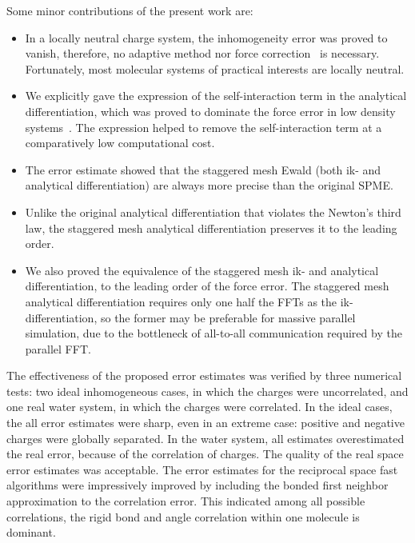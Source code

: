 \documentclass[aps,pre,preprint,unsortedaddress]{revtex4}
\newcommand{\recheck}[1]{{\color{red} #1}}
\newcommand{\redc}[1]{{\color{red} #1}}
\begin{document}

Some minor contributions of the present work are:
\begin{itemize}\itemsep -3pt
\item In a locally neutral charge system, the inhomogeneity
  error was proved to vanish, therefore, no adaptive method nor
  force correction~\cite{wang2012} is necessary. Fortunately, most
  molecular systems of practical interests are locally neutral.
\item We explicitly gave the expression of the self-interaction term
  in the analytical differentiation, which was proved to \redc{dominate} the
  force error in low density systems~\cite{cerutti2009staggered}.  The
  expression helped \redc{to remove} the self-interaction term at a comparatively low
  computational cost.
\item The error estimate showed that the staggered mesh Ewald
  (both ik- and analytical differentiation) are always more precise than
  the original SPME.
\item Unlike the original analytical differentiation
  that violates the Newton's third law, the staggered mesh analytical
  differentiation preserves it to the leading order.
\item We also proved the equivalence of the staggered mesh ik- and analytical
  differentiation, to the leading order of the force error.
  The staggered mesh analytical differentiation requires only one half \redc{the}
  FFTs as the ik-differentiation, so the former may be preferable
  for massive parallel simulation, due to the bottleneck of all-to-all
  communication required by the parallel FFT.
\end{itemize}

The effectiveness of the proposed error estimates was verified by
three numerical tests: two ideal inhomogeneous cases, in which the charges
were uncorrelated,
and one real water system, in which the charges were correlated.
In the ideal cases, the all error estimates were sharp, even in an extreme
case: positive and negative charges were globally separated. 
In the water system,  all estimates overestimated the real error,
because of the correlation of charges.
The quality of the real space error estimates 
was acceptable.
The error estimates for the reciprocal space fast algorithms
were impressively improved by including the \recheck{bonded}
first neighbor approximation
to the correlation error.
This indicated among all possible correlations,
the rigid bond and angle correlation within one molecule
is dominant.
\end{document}
